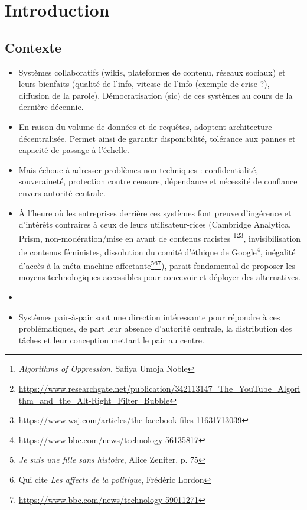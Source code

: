\documentclass[12pt]{thesul}
\begin{document}
\DontWriteThisInToc
\listoffigures

\mainmatter
\NumberThisInToc
\chapter*{Introduction}
\minitoc
\section{Contexte}

\begin{itemize}
  \item Systèmes collaboratifs (wikis, plateformes de contenu, réseaux sociaux) et leurs bienfaits (qualité de l'info, vitesse de l'info (exemple de crise ?), diffusion de la parole).
    Démocratisation (sic) de ces systèmes au cours de la dernière décennie.
  \item En raison du volume de données et de requêtes, adoptent architecture décentralisée.
    Permet ainsi de garantir disponibilité, tolérance aux pannes et capacité de passage à l'échelle.
  \item Mais échoue à adresser problèmes non-techniques : confidentialité, souveraineté, protection contre censure, dépendance et nécessité de confiance envers autorité centrale.
  \item À l'heure où les entreprises derrière ces systèmes font preuve d'ingérence et d'intérêts contraires à ceux de leurs utilisateur-rices (Cambridge Analytica, Prism, non-modération/mise en avant de contenus racistes \footnote{\emph{Algorithms of Oppression}, Safiya Umoja Noble}\footnote{\url{https://www.researchgate.net/publication/342113147_The_YouTube_Algorithm_and_the_Alt-Right_Filter_Bubble}}\footnote{\url{https://www.wsj.com/articles/the-facebook-files-11631713039}}, invisibilisation de contenus féministes, dissolution du comité d'éthique de Google\footnote{\url{https://www.bbc.com/news/technology-56135817}}, inégalité d'accès à la méta-machine affectante\footnote{\emph{Je suis une fille sans histoire}, Alice Zeniter, p. 75}\footnote{Qui cite \emph{Les affects de la politique}, Frédéric Lordon}\footnote{\url{https://www.bbc.com/news/technology-59011271}}), parait fondamental de proposer les moyens technologiques accessibles pour concevoir et déployer des alternatives.
  \item {}
  \item Systèmes pair-à-pair sont une direction intéressante pour répondre à ces problématiques, de part leur absence d'autorité centrale, la distribution des tâches et leur conception mettant le pair au centre.

\end{itemize}
\end{document}
